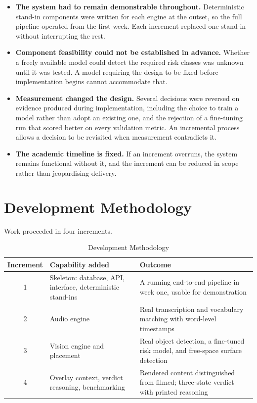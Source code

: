 \documentclass[
12pt,
a4paper,
oneside
]{report}
\begin{document}
\begin{itemize}[itemsep=4pt]
\item \textbf{The system had to remain demonstrable throughout.} Deterministic
stand-in components were written for each engine at the outset, so the full
pipeline operated from the first week. Each increment replaced one stand-in
without interrupting the rest.

\item \textbf{Component feasibility could not be established in advance.}
Whether a freely available model could detect the required risk classes was
unknown until it was tested. A model requiring the design to be fixed before
implementation begins cannot accommodate that.

\item \textbf{Measurement changed the design.} Several decisions were reversed
on evidence produced during implementation, including the choice to train a
model rather than adopt an existing one, and the rejection of a fine-tuning run
that scored better on every validation metric. An incremental process allows a
decision to be revisited when measurement contradicts it.

\item \textbf{The academic timeline is fixed.} If an increment overruns, the
system remains functional without it, and the increment can be reduced in scope
rather than jeopardising delivery.
\end{itemize}

\section{Development Methodology}

Work proceeded in four increments.

\begin{table}[H]
\centering
\begin{tabular}{|c|p{4.2cm}|p{6cm}|}
\hline
\textbf{Increment} & \textbf{Capability added} & \textbf{Outcome} \\
\hline
1 & Skeleton: database, API, interface, deterministic stand-ins & A running
end-to-end pipeline in week one, usable for demonstration \\
\hline
2 & Audio engine & Real transcription and vocabulary matching with word-level
timestamps \\
\hline
3 & Vision engine and placement & Real object detection, a fine-tuned risk
model, and free-space surface detection \\
\hline
4 & Overlay context, verdict reasoning, benchmarking & Rendered content
distinguished from filmed; three-state verdict with printed reasoning \\
\hline
\end{tabular}
\caption{Development Methodology}
\end{table}
\end{document}
